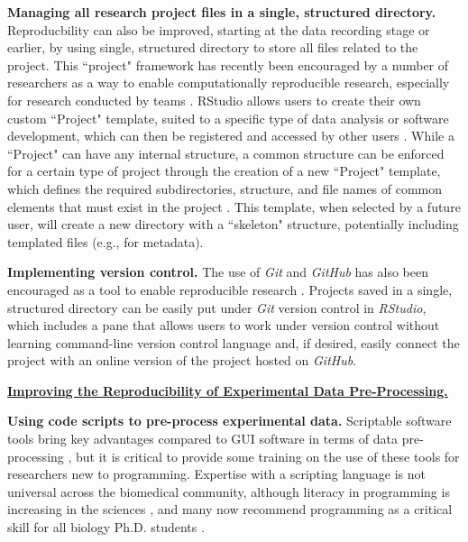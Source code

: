 \documentclass[pdftex,english,11pt,parskip=half]{scrartcl}
\begin{document}
\textbf{Managing all research project files in a single, structured directory.} Reproducbility can also be improved, starting at the data recording stage or earlier, by using single, structured directory to store all files related to the project. This ``project" framework has recently been encouraged by a number of researchers as a way to enable computationally reproducible research, especially for research conducted by teams \cite{marwick2017packaging, parker2017opinionated, lowndes2017our}. RStudio allows users to create their own custom ``Project" template, suited to a specific type of data analysis or software development, which can then be registered and accessed by other users \cite{rstudioprojecttemplate}. While a ``Project" can have any internal structure, a common structure can be enforced for a certain type of project through the creation of a new ``Project" template, which defines the required subdirectories, structure, and file names of common elements that must exist in the project \cite{rstudioprojecttemplate}. This template, when selected by a future user, will create a new directory with a ``skeleton" structure, potentially including templated files (e.g., for metadata).

\textbf{Implementing version control.} The use of \textit{Git} and \textit{GitHub} has also been encouraged as a tool to enable reproducible research \cite{piccolo2016tools, ram2013git, bryan2017excuse, lowndes2017our, cetinkaya2017infrastructure}. Projects saved in a single, structured directory can be easily put under \textit{Git} version control in \textit{RStudio}, which includes a pane that allows users to work under version control without learning command-line version control language and, if desired, easily connect the project with an online version of the project hosted on \textit{GitHub}. 

\underline{\textbf{Improving the Reproducibility of Experimental Data Pre-Processing.}}

\textbf{Using code scripts to pre-process experimental data.} Scriptable software tools bring key advantages compared to GUI software in terms of data pre-processing \cite{cetinkaya2017infrastructure, huber2015orchestrating, preeyanon2014reproducible, piccolo2016tools}, but it is critical to provide some training on the use of these tools for researchers new to programming. Expertise with a scripting language is not universal across the biomedical community, although literacy in programming is increasing in the sciences \cite{ram2013git}, and many now recommend programming as a critical skill for all biology Ph.D. students \cite{list2017ten}. 
\end{document}

